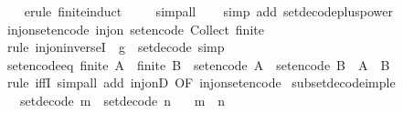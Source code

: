 \begin{isabellebody}
%
\isadelimproof
\ \ %
\endisadelimproof
%
\isatagproof
{}\isamarkupfalse%
\ {\isacharparenleft}erule\ finite{\isacharunderscore}induct{\isacharparenright}\isanewline
\ \ \ \isamarkupfalse%
\ simp{\isacharunderscore}all\isanewline
\ \ \isamarkupfalse%
\ {\isacharparenleft}simp\ add{\isacharcolon}\ set{\isacharunderscore}decode{\isacharunderscore}plus{\isacharunderscore}power{\isacharunderscore}{}{\isacharparenright}\isanewline
\ \ \isamarkupfalse%
%
\endisatagproof
{\isafoldproof}%
%
\isadelimproof
\isanewline
%
\endisadelimproof
\isanewline
{}\isamarkupfalse%
\ inj{\isacharunderscore}on{\isacharunderscore}set{\isacharunderscore}encode{\isacharcolon}\ {\isachardoublequoteopen}inj{\isacharunderscore}on\ set{\isacharunderscore}encode\ {\isacharparenleft}Collect\ finite{\isacharparenright}{\isachardoublequoteclose}\isanewline
%
\isadelimproof
\ \ %
\endisadelimproof
%
\isatagproof
{}\isamarkupfalse%
\ {\isacharparenleft}rule\ inj{\isacharunderscore}on{\isacharunderscore}inverseI\ {\isacharbrackleft}\ g\ {\isacharequal}\ {\isachardoublequoteopen}set{\isacharunderscore}decode{\isachardoublequoteclose}{\isacharbrackright}{\isacharparenright}\ simp%
\endisatagproof
{\isafoldproof}%
%
\isadelimproof
\isanewline
%
\endisadelimproof
\isanewline
{}\isamarkupfalse%
\ set{\isacharunderscore}encode{\isacharunderscore}eq{\isacharcolon}\ {\isachardoublequoteopen}finite\ A\ {\isasymLongrightarrow}\ finite\ B\ {\isasymLongrightarrow}\ set{\isacharunderscore}encode\ A\ {\isacharequal}\ set{\isacharunderscore}encode\ B\ {\isasymlongleftrightarrow}\ A\ {\isacharequal}\ B{\isachardoublequoteclose}\isanewline
%
\isadelimproof
\ \ %
\endisadelimproof
%
\isatagproof
{}\isamarkupfalse%
\ {\isacharparenleft}rule\ iffI{\isacharparenright}\ {\isacharparenleft}simp{\isacharunderscore}all\ add{\isacharcolon}\ inj{\isacharunderscore}onD\ {\isacharbrackleft}OF\ inj{\isacharunderscore}on{\isacharunderscore}set{\isacharunderscore}encode{\isacharbrackright}{\isacharparenright}%
\endisatagproof
{\isafoldproof}%
%
\isadelimproof
\isanewline
%
\endisadelimproof
\isanewline
{}\isamarkupfalse%
\ subset{\isacharunderscore}decode{\isacharunderscore}imp{\isacharunderscore}le{\isacharcolon}\isanewline
\ \ \ {\isachardoublequoteopen}set{\isacharunderscore}decode\ m\ {\isasymsubseteq}\ set{\isacharunderscore}decode\ n{\isachardoublequoteclose}\isanewline
\ \ \ {\isachardoublequoteopen}m\ {\isasymle}\ n{\isachardoublequoteclose}\isanewline

\end{isabellebody}

